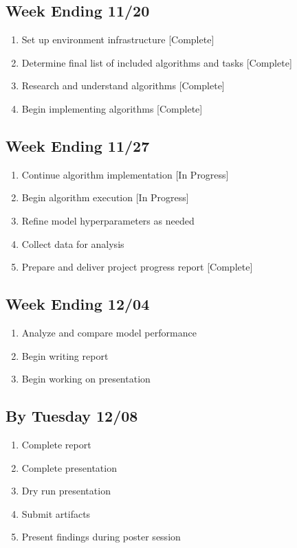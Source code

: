 \documentclass[conference]{IEEEtran}
\begin{document}
\subsection{Week Ending 11/20}
\begin{enumerate}
    \item Set up environment infrastructure [Complete]
    \item Determine final list of included algorithms and tasks [Complete]
    \item Research and understand algorithms [Complete]
    \item Begin implementing algorithms [Complete]
\end{enumerate}

\subsection{Week Ending 11/27}
\begin{enumerate}
    \item Continue algorithm implementation [In Progress]
    \item Begin algorithm execution [In Progress]
    \item Refine model hyperparameters as needed
    \item Collect data for analysis
    \item Prepare and deliver project progress report [Complete]
\end{enumerate}

\subsection{Week Ending 12/04}
\begin{enumerate}
    \item Analyze and compare model performance
    \item Begin writing report
    \item Begin working on presentation
\end{enumerate}

\subsection{By Tuesday 12/08}
\begin{enumerate}
    \item Complete report
    \item Complete presentation
    \item Dry run presentation
    \item Submit artifacts
    \item Present findings during poster session
\end{enumerate}
\end{document}
